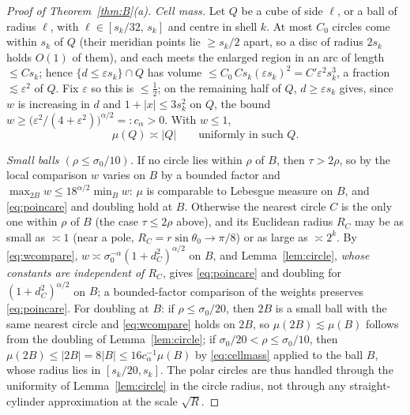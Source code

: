 \documentclass[11pt]{amsart}
\newcommand{\abs}[1]{\lvert #1\rvert}
\theoremstyle{plain}
\theoremstyle{definition}
\theoremstyle{remark}
\begin{document}
\begin{proof}[Proof of Theorem~\ref{thm:B}(a)]
\emph{Cell mass.} Let $Q$ be a cube of side $\ell$, or a ball of radius $\ell$,
with $\ell\in[s_k/32,\,s_k]$ and centre in shell $k$.
At most $C_0$ circles come within $s_k$ of $Q$ (their meridian points lie
$\ge s_k/2$ apart, so a disc of radius $2s_k$ holds $O(1)$ of them), and each
meets the enlarged region in an arc of length $\le Cs_k$; hence
$\{d\le\varepsilon s_k\}\cap Q$ has volume $\le C_0\,Cs_k(\varepsilon s_k)^2=
C'\varepsilon^2 s_k^3$, a fraction $\lesssim\varepsilon^2$ of $Q$. Fix
$\varepsilon$ so this is $\le\tfrac12$; on the remaining half of $Q$,
$d\ge\varepsilon s_k$ gives, since $w$ is increasing in $d$ and $1+\abs x\le
3s_k^2$ on $Q$, the bound $w\ge\bigl(\varepsilon^2/(4+\varepsilon^2)\bigr)^{\alpha/2}
=:c_\alpha>0$.
With $w\le1$,
\begin{equation}\label{eq:cellmass}
\mu(Q)\asymp\abs Q\qquad\text{uniformly in such }Q.
\end{equation}

\emph{Small balls $(\rho\le\sigma_0/10)$.} If no circle lies within $\rho$ of $B$,
then $\tau>2\rho$, so by the local comparison $w$ varies on $B$ by a bounded
factor and $\max_{2B}w\le18^{\alpha/2}\min_Bw$: $\mu$ is comparable to Lebesgue
measure on $B$, and \eqref{eq:poincare} and doubling hold at $B$. Otherwise the
nearest circle $C$ is the only one within $\rho$ of $B$ (the
case $\tau\le2\rho$ above), and its Euclidean radius
$R_C$ may be as small as $\asymp1$ (near a pole, $R_C=r\sin\theta_0\to\pi/8$) or
as large as $\asymp2^k$. By \eqref{eq:wcompare}, $w\asymp\sigma_0^{-\alpha}
(1+d_C^2)^{\alpha/2}$ on $B$, and Lemma~\ref{lem:circle}, \emph{whose constants
are independent of $R_C$}, gives \eqref{eq:poincare} and doubling for
$(1+d_C^2)^{\alpha/2}$ on $B$; a bounded-factor comparison of the weights
preserves \eqref{eq:poincare}. For doubling at $B$: if $\rho\le\sigma_0/20$,
then $2B$ is a small ball with the same nearest circle and \eqref{eq:wcompare}
holds on $2B$, so $\mu(2B)\lesssim\mu(B)$ follows from the doubling of
Lemma~\ref{lem:circle}; if $\sigma_0/20<\rho\le\sigma_0/10$, then
$\mu(2B)\le\abs{2B}=8\abs B\le16c_\alpha^{-1}\mu(B)$ by \eqref{eq:cellmass}
applied to the ball $B$, whose radius lies in $[s_k/20,s_k]$. The polar circles
are thus handled through
the uniformity of Lemma~\ref{lem:circle} in the circle radius, not through any
straight-cylinder approximation at the scale $\sqrt R$.


\end{proof}
\end{document}
